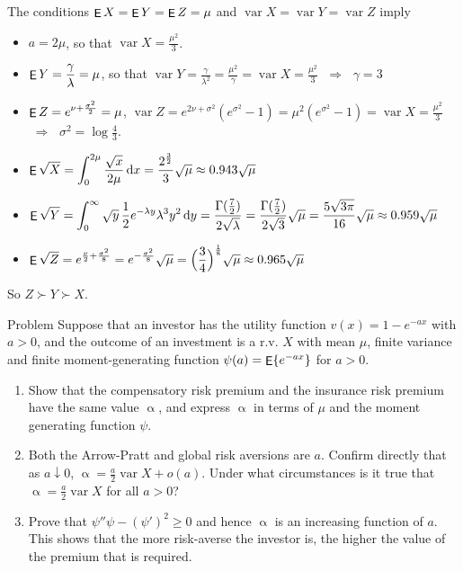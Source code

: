\documentclass[10pt]{beamer}
\newcommand{\ds}{\displaystyle}
\newcommand{\ie}{\;\Longrightarrow\;}
\DeclareMathOperator\expc{{\sf E}}
\DeclareMathOperator\var{var}
\theoremstyle{definition}
\begin{document}
\begin{frame}[allowframebreaks]
  The conditions $\expc X = \expc Y = \expc Z = \mu$ and $\var X = \var Y = \var Z$ imply 
  \begin{itemize}
    \item $a = 2\mu$, so that $\ds\var X = \frac{\mu^2}{3}$.
    \item $\ds\expc Y = \frac{\gamma}{\lambda} = \mu$, so that $\ds\var Y = \frac{\gamma}{\lambda^2} = \frac{\mu^2}{\gamma} = \var X = \frac{\mu^2}{3}$ $\ie$ $\gamma = 3$ 
    \item $\ds\expc Z = e^{\nu + \frac{\sigma^2}{2}} = \mu$, $\ds\var Z = e^{2\nu + \sigma^2}(e^{\sigma^2} - 1) = \mu^2(e^{\sigma^2} - 1) = \var X = \frac{\mu^2}{3}$ $\ie$ $\ds\sigma^2 = \log\frac{4}{3}$. 
  \end{itemize}
  \begin{itemize}
    \item $\ds\expc\sqrt{X} = \int_0^{2\mu}\frac{\sqrt{x}}{2\mu}\,\text{d}x = \frac{2^{\frac{3}{2}}}{3}\sqrt{\mu}\approx 0.943\sqrt{\mu}$
    \item $\ds\expc\sqrt{Y} = \int_0^\infty\sqrt{y}\,\frac{1}{2}e^{-\lambda y}\lambda^3 y^2\,\text{d}y = \frac{\Gamma(\frac{7}{2})}{2\sqrt{\lambda}} = \frac{\Gamma(\frac{7}{2})}{2\sqrt{3}}\sqrt{\mu} = \frac{5\sqrt{3\pi}}{16}\sqrt{\mu}\approx 0.959\sqrt{\mu}$
    \item $\ds\expc\sqrt{Z} = e^{\frac{\nu}{2} + \frac{\sigma^2}{8}} = e^{-\frac{\sigma^2}{8}}\sqrt{\mu} = \Big(\frac{3}{4}\Big)^{\frac{1}{8}}\sqrt{\mu}\approx 0.965\sqrt{\mu}$
  \end{itemize}
  So $Z\succ Y\succ X$.
\end{frame}

\begin{frame}{Problem}
  Suppose that an investor has the utility function $v(x) = 1 - e^{-a x}$ with $a > 0$, and the outcome of an investment is a r.v. $X$ with mean $\mu$, finite variance and finite moment-generating function $\psi(a) = \expc\{e^{-ax}\}$ for $a > 0$. 
  \begin{enumerate}
    \item Show that the compensatory risk premium and the insurance risk premium have the same value $\upalpha$, and express $\upalpha$ in terms of $\mu$ and the moment generating function $\psi$.
    \item Both the Arrow-Pratt and global risk aversions are $a$. Confirm directly that as $a\downarrow 0$, $\ds\upalpha = \frac{a}{2}\var{X} + o(a)$. Under what circumstances is it true that $\ds\upalpha = \frac{a}{2}\var{X}$ for all $a > 0$?
    \item Prove that $\psi''\psi - (\psi')^2\geqslant 0$ and hence $\upalpha$ is an increasing function of $a$. This shows that the more risk-averse the investor is, the higher the value of the premium that is required.
  \end{enumerate}
\end{frame}
\end{document}
